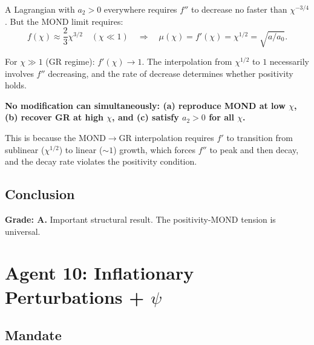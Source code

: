\documentclass[11pt,a4paper]{article}
\begin{document}
A Lagrangian with $a_2 > 0$ everywhere requires $f''$ to decrease no faster than $\chi^{-3/4}$. But the MOND limit requires:
\begin{equation}
f(\chi) \approx \frac{2}{3}\chi^{3/2} \quad (\chi \ll 1) \quad \Rightarrow \quad \mu(\chi) = f'(\chi) = \chi^{1/2} = \sqrt{a/a_0}.
\end{equation}

For $\chi \gg 1$ (GR regime): $f'(\chi) \to 1$. The interpolation from $\chi^{1/2}$ to $1$ necessarily involves $f''$ decreasing, and the rate of decrease determines whether positivity holds.

\textbf{No modification can simultaneously: (a) reproduce MOND at low $\chi$, (b) recover GR at high $\chi$, and (c) satisfy $a_2 > 0$ for all $\chi$.}

This is because the MOND$\to$GR interpolation requires $f'$ to transition from sublinear ($\chi^{1/2}$) to linear ($\sim 1$) growth, which forces $f''$ to peak and then decay, and the decay rate violates the positivity condition.

\subsection{Conclusion}

\begin{center}
\end{center}

\textbf{Grade: A.} Important structural result. The positivity-MOND tension is universal.


\newpage
\section{Agent 10: Inflationary Perturbations + $\psi$}
\label{sec:agent10}

\subsection{Mandate}
\end{document}

